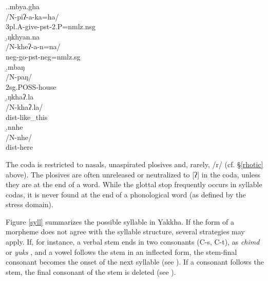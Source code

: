 \ex.\a.\glll	mbya.gha\\
			/N-piʔ-a-ka=ha/\\
			{\sc 3pl.A-}give{\sc -pst-2.P=nmlz.nsg}\\
			\b.\glll ŋkhyan.na\\
			/N-kheʔ-a-n=na/\\
			{\sc neg-}go{\sc [3sg]-pst-neg=nmlz.sg}\\
			\b.\glll	mbaŋ\\
			/N-paŋ/\\
			{\sc 2sg.POSS-}house\\
			\b.\glll ŋkhaʔ.la\\
			/N-khaʔ.la/\\
			{\sc dist-}like\_this\\
			\b.\glll  nnhe\\
			/N-nhe/\\
			{\sc dist-}here\\



The coda is restricted to nasals, unaspirated plosives  and, rarely, /r/ (cf. §\ref{rhotic} above). The plosives are often unreleased or neutralized to [ʔ] in the coda, unless they are at the end of a word. While the glottal stop frequently occurs in syllable codas, it  is never found at the end of a phonological word (as defined by the stress domain).  


Figure \ref{syll} summarizes the possible syllable in Yakkha. If the form of a morpheme does not agree with the syllable structure, several strategies may apply. If, for instance, a verbal stem ends in two consonants (C-s, C-t), as \emph{chimd}  or \emph{yuks} , and a vowel follows the stem in an inflected form, the stem-final consonant becomes the onset of the next syllable (see \Next). If a consonant follows the stem, the final consonant of the stem is deleted (see \NNext). 


